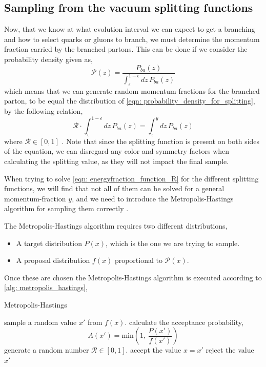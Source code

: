 \documentclass[main.tex]{subfiles}
\begin{document}
\subsection{Sampling from the vacuum splitting functions}\label{sec: metropolis_hastings}
Now, that we know at what evolution interval we can expect to get a branching and how to select quarks or gluons to branch, we must determine the momentum fraction carried by the branched partons.
This can be done if we consider the probability density given as,
\begin{equation}\label{eqn: probability_density_for_splitting}
    \mathcal{P}(z) = \frac{ P_{ba}(z)}{\int_\epsilon^{1-\epsilon} dz \, P_{ba}(z)}
\end{equation}
which means that we can generate random momentum fractions for the branched parton, to be equal the distribution of \eqref{eqn: probability_density_for_splitting}, by the following relation,
\begin{equation}\label{eqn: energyfraction_function_R}
    \mathcal{R} \cdot \int_\epsilon^{1-\epsilon} dz \, P_{ba}(z) = \int_\epsilon^{y}dz \, P_{ba}(z)
\end{equation}
where \(\mathcal{R}\in [0,1]\) \cite{ellis_stirling_webber_1996}. Note that since the splitting function is present on both sides of the equation, we can disregard any color and symmetry factors when calculating the splitting value, as they will not impact the final sample.

When trying to solve \autoref{eqn: energyfraction_function_R} for the different splitting functions, we will find that not all of them can be solved for a general momentum-fraction \(y\), and we need to introduce the Metropolis-Hastings algorithm for sampling them correctly \cite{MCMC_andrieu2003}.

The Metropolis-Hastings algorithm requires two different distributions,
\begin{itemize}
    \item A target distribution \(P(x)\), which is the one we are trying to sample.
    \item A proposal distribution \(f(x)\) proportional to \(\mathcal{P}(x)\).
\end{itemize}
Once these are chosen the Metropolis-Hastings algorithm is executed according to \autoref{alg: metropolis_hastings},
\begin{center}
\begin{minipage}{.8\linewidth}
\begin{algorithm}[H]
\caption{Metropolis-Hastings}
\label{alg: metropolis_hastings}
\begin{algorithmic}[1]
    \State sample a random value \(x'\) from \(f(x)\).
    \State calculate the acceptance probability, \[A(x') = \text{min} \left(1, \, \frac{P(x')}{f(x')}\right)\]
    \State generate a random number \(\mathcal{R}\in [0,1]\).
        \Statey accept the value \(x = x'\)
        \Statey reject the value \(x'\)
    \EndIf
\end{algorithmic}
\end{algorithm}
\end{minipage}
\end{center}
\end{document}
